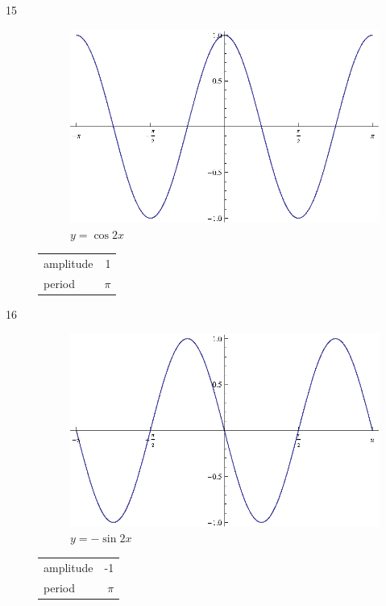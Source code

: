 \documentclass{exam}
\begin{document}
\begin{description}
      \item[15]
        \begin{figure}[H]
          \centering
          \includegraphics[scale=0.8]{exercise15.eps}
          \caption{$y = \cos 2x$}
        \end{figure}

        \begin{tabular}[H]{lr}
          \toprule
          amplitude & 1 \\
          period & $\pi$ \\
          \bottomrule
        \end{tabular}

      \item[16]
        \begin{figure}[H]
          \centering
          \includegraphics[scale=0.9]{exercise16.eps}
          \caption{$y = - \sin 2x$}
        \end{figure}

        \begin{tabular}[H]{lr}
          \toprule
          amplitude & -1 \\
          period & $\pi$ \\
          \bottomrule
        \end{tabular}


\end{description}
\end{document}
